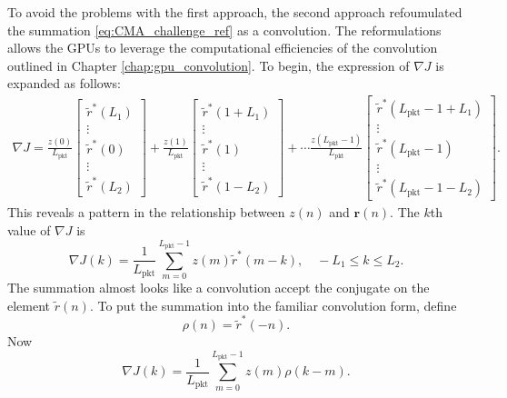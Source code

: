 To avoid the problems with the first approach, the second approach refoumulated the summation \eqref{eq:CMA_challenge_ref} as a convolution.
The reformulations allows the GPUs to leverage the computational efficiencies of the convolution outlined in Chapter \ref{chap:gpu_convolution}.
To begin, the expression of $\nabla J$ is expanded as follows:
\begin{multline}
\nabla J
	= 
	\frac{z(0)}{L_\text{pkt}}
		\begin{bmatrix} \tilde{r}^\ast(L_1) \\ \vdots \\ \tilde{r}^\ast(0) \\ \vdots \\ \tilde{r}^\ast(L_2) \end{bmatrix} +
	\frac{z(1)}{L_\text{pkt}}
		\begin{bmatrix} \tilde{r}^\ast(1+L_1) \\ \vdots \\ \tilde{r}^\ast(1) \\ \vdots \\ \tilde{r}^\ast(1-L_2) \end{bmatrix} + \cdots
	\frac{z(L_\text{pkt}-1)}{L_\text{pkt}}
		\begin{bmatrix} \tilde{r}^\ast(L_\text{pkt}-1+L_1) \\ \vdots \\ \tilde{r}^\ast(L_\text{pkt}-1) \\ \vdots \\ \tilde{r}^\ast(L_\text{pkt}-1-L_2) \end{bmatrix}.
\label{eq:delJ_writeoutr}
\end{multline}
This reveals a pattern in the relationship between $z(n)$ and $\mathbf{r}(n)$.
The $k$th value of $\nabla J$ is
\begin{equation}
\nabla J(k) = \frac{1}{L_\text{pkt}} \sum^{L_\text{pkt}-1}_{m=0}  z(m) \tilde{r}^\ast(m-k), \quad -L_1 \leq k \leq L_2.
\label{eq:delJ_direct_way}
\end{equation}
The summation almost looks like a convolution accept the conjugate on the element $\tilde{r}(n)$.
To put the summation into the familiar convolution form, define
\begin{equation}
\rho(n) = \tilde{r}^\ast(-n).
\end{equation}
Now
\begin{equation}
\nabla J(k) = \frac{1}{L_\text{pkt}} \sum^{L_\text{pkt}-1}_{m=0}  z(m) \rho(k-m).
\label{eq:CMA_delJ_rice_reformed}
\end{equation}


